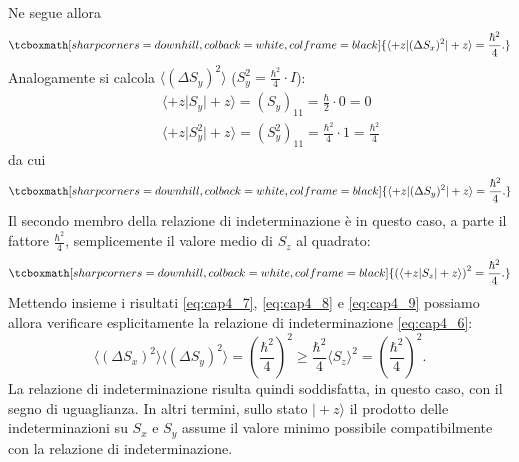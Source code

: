Ne segue allora
	\begin{equation}
		\label{eq:cap4_7}
		\tcboxmath[sharp corners=downhill, colback=white, colframe=black]{
			\langle +z \vert (\Delta S_x)^2\vert +z \rangle = \frac{\hbar ^2}{4}.
			}
	\end{equation}
Analogamente si calcola $\langle (\Delta S_y)^2 \rangle $ ($S_y ^2= \frac{\hbar ^2}{4}\cdot I$):
	\begin{eqnarray}
	& &\displaystyle{\langle +z \vert S_y \vert +z \rangle = (S_y)_{11} = \frac{\hbar}{2}\cdot 0 =0}  \\
	& &\displaystyle{\langle +z \vert S_y ^2\vert +z \rangle = (S_y ^2)_{11} = \frac{\hbar ^2}{4}\cdot 1 =\frac{\hbar ^2}{4}} \nonumber
	\end{eqnarray}
da cui
	\begin{equation}
		\label{eq:cap4_8}
		\tcboxmath[sharp corners=downhill, colback=white, colframe=black]{
			\langle +z \vert (\Delta S_y)^2\vert +z \rangle = \frac{\hbar ^2}{4}.
			}
	\end{equation}
Il secondo membro della relazione di indeterminazione è in questo caso, a parte il fattore $\frac{\hbar ^2}{4}$, semplicemente il valore medio di $S_z$ al quadrato:
	\begin{equation}
		\label{eq:cap4_9}
		\tcboxmath[sharp corners=downhill, colback=white, colframe=black]{
			\left( \langle +z \vert S_z \vert +z \rangle \right) ^2 = \frac{\hbar ^2}{4}.
			}
	\end{equation}
Mettendo insieme i risultati \eqref{eq:cap4_7}, \eqref{eq:cap4_8} e \eqref{eq:cap4_9} possiamo allora verificare esplicitamente la relazione di indeterminazione \eqref{eq:cap4_6}:
	\begin{equation}
		\langle  (\Delta S_x)^2 \rangle \langle(\Delta S_y)^2 \rangle = \left(\frac{\hbar ^2}{4} \right) ^2 \geq \frac{\hbar ^2}{4} \langle S_z  \rangle ^2 = \left(\frac{\hbar ^2}{4} \right) ^2.
	\end{equation}
La relazione di indeterminazione risulta quindi soddisfatta, in questo caso, con il segno di uguaglianza. In altri termini, sullo stato $\vert +z \rangle $ il prodotto delle indeterminazioni su $S_x$ e $S_y$ assume il valore minimo possibile compatibilmente con la relazione di indeterminazione.\\ \\

